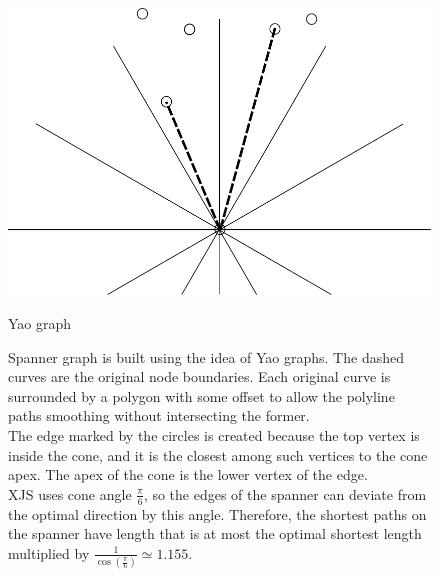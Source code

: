 \documentclass{gd-llncs}
\begin{document}
\begin{figure}[]
  \centering
  \begin{minipage}[b]{0.5\textwidth}
    \includegraphics[width=\textwidth]{yao.pdf}
    \caption{\small{Yao graph}}
    \label{fig:yao}
  \end{minipage}
  \vfill
  \begin{minipage}[b]{\textwidth}
    
    \caption{\small{Spanner graph is built using the idea of Yao graphs. The dashed curves are the original node boundaries. Each original curve is surrounded by a polygon with some offset to allow the polyline paths smoothing without intersecting the former. \\
        The edge marked by the circles is created because the top vertex is inside the cone, and it is the closest among such vertices to the cone apex. The apex of the cone is the lower vertex of the edge. \\XJS uses cone angle $\frac{\pi}{6}$, so the edges of the spanner can deviate from the optimal direction by this angle. Therefore, the shortest paths on the spanner have length that is at most the optimal shortest length multiplied by $\frac{1}{\cos(\frac{\pi}{6})} \simeq 1.155$.}
    }
    \label{fig:spanner}
  \end{minipage}
\end{figure}
\end{document}
